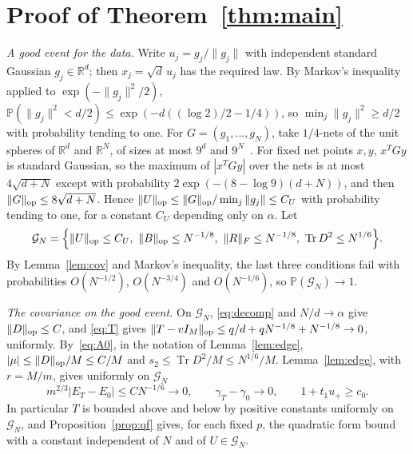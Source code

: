 \documentclass[11pt]{amsart}
\theoremstyle{remark}
\numberwithin{equation}{section}
\newcommand{\PP}{\mathbb{P}}
\newcommand{\RR}{\mathbb{R}}
\DeclareMathOperator{\Tr}{Tr}
\begin{document}
\section{Proof of Theorem~\ref{thm:main}}\label{sec:proof}
\emph{A good event for the data.} Write $u_j=g_j/\|g_j\|$ with independent standard Gaussian $g_j\in\RR^{d}$; then $x_j=\sqrt d\,u_j$ has the required law. By Markov's inequality applied to $\exp(-\|g_j\|^2/2)$, $\PP(\|g_j\|^2<d/2)\le\exp(-d((\log2)/2-1/4))$, so $\min_j\|g_j\|^2\ge d/2$ with probability tending to one. For $G=(g_1,\dots,g_N)$, take $1/4$-nets of the unit spheres of $\RR^{d}$ and $\RR^{N}$, of sizes at most $9^{d}$ and $9^{N}$~\cite[Corollary~4.2.13]{Vershynin}. For fixed net points $x,y$, $x^{T}Gy$ is standard Gaussian, so the maximum of $|x^{T}Gy|$ over the nets is at most $4\sqrt{d+N}$ except with probability $2\exp(-(8-\log9)(d+N))$, and then $\|G\|_{\rm op}\le8\sqrt{d+N}$. Hence $\|U\|_{\rm op}\le\|G\|_{\rm op}/\min_j\|g_j\|\le C_U$ with probability tending to one, for a constant $C_U$ depending only on $\alpha$. Let
\[
\mathcal G_N=\Bigl\{\|U\|_{\rm op}\le C_U,\ \|B\|_{\rm op}\le N^{-1/8},\ \|R\|_F\le N^{-1/8},\ \Tr D^2\le N^{1/6}\Bigr\}.
\]
By Lemma~\ref{lem:cov} and Markov's inequality, the last three conditions fail with probabilities $O(N^{-1/2})$, $O(N^{-3/4})$ and $O(N^{-1/6})$, so $\PP(\mathcal G_N)\to1$.

\emph{The covariance on the good event.} On $\mathcal G_N$, \eqref{eq:decomp} and $N/d\to\alpha$ give $\|D\|_{\rm op}\le C$, and \eqref{eq:T} gives $\|T-vI_M\|_{\rm op}\le q/d+qN^{-1/8}+N^{-1/8}\to0$, uniformly. By~\eqref{eq:A0}, in the notation of Lemma~\ref{lem:edge}, $|\mu|\le\|D\|_{\rm op}/M\le C/M$ and $s_2\le\Tr D^2/M\le N^{1/6}/M$. Lemma~\ref{lem:edge}, with $r=M/m$, gives uniformly on $\mathcal G_N$
\begin{equation}\label{eq:shift}
m^{2/3}|E_T-E_0|\le CN^{-1/6}\to0,\qquad\gamma_T-\gamma_0\to0,\qquad1+t_1u_+\ge c_0.
\end{equation}
In particular $T$ is bounded above and below by positive constants uniformly on $\mathcal G_N$, and Proposition~\ref{prop:qf} gives, for each fixed $p$, the quadratic form bound with a constant independent of $N$ and of $U\in\mathcal G_N$.
\end{document}
